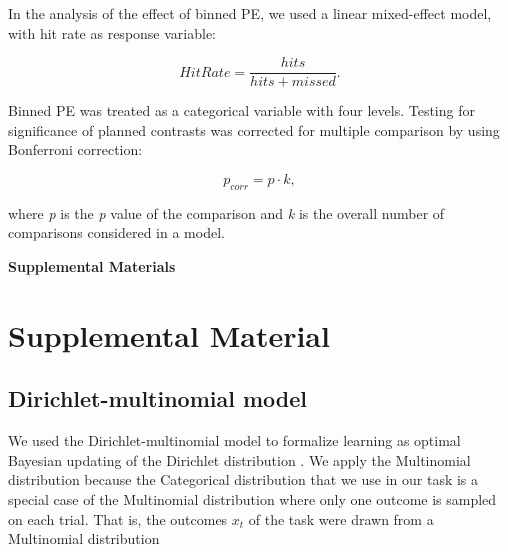 \documentclass[a4paper,12pt]{article}
\begin{document}
\noindent
In the analysis of the effect of binned PE, we used a linear mixed-effect model, with hit rate as response variable:

\begin{equation}
Hit Rate =   \dfrac{hits}{hits+missed}.
\end{equation}

\noindent
Binned PE was treated as a categorical variable with four levels. Testing for significance of planned contrasts was corrected for multiple comparison by using Bonferroni correction:

\begin{equation}
p_{corr} =   p \cdot k, 
\end{equation}

\noindent
where \textit{p} is the \textit{p} value of the comparison and \textit{k} is the overall number of comparisons considered in a model. 





%
 

\pagebreak
\begin{center}
\textbf{\large Supplemental Materials}
\end{center}
\setcounter{equation}{0}
\setcounter{figure}{0}
\setcounter{table}{0}
\setcounter{page}{1}
\makeatletter
\renewcommand{\theequation}{S\arabic{equation}}
\renewcommand{\thefigure}{S\arabic{figure}}
\renewcommand{\bibnumfmt}[1]{[S#1]}
\renewcommand{\citenumfont}[1]{S#1}



\section{Supplemental Material}
\subsection*{Dirichlet-multinomial model}

We used the Dirichlet-multinomial model to formalize learning as optimal Bayesian updating of the Dirichlet distribution \citep{Murphy2012}. We apply the Multinomial distribution because the Categorical distribution that we use in our task is a special case of the Multinomial distribution where only one outcome is sampled on each trial. That is, the outcomes $x_t$ of the task were drawn from a Multinomial distribution
\end{document}
